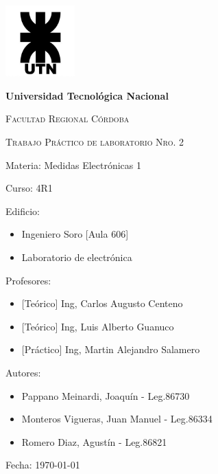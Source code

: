 \documentclass[12pt, letterpaper]{article}
\begin{document}
\begin{titlepage}
	\centering %
	{\includegraphics[width=0.2\textwidth]{imagenes/UTN_logo.jpg}\par}
	{\bfseries\LARGE Universidad Tecnológica Nacional \par}
	{\scshape\Large Facultad Regional Córdoba\par}
	\vspace{0.5cm}
	{\scshape\Huge Trabajo Práctico de laboratorio Nro. 2  \par}%
	\raggedright %
	\vspace{0.5cm}
	{\Large Materia: Medidas Electrónicas 1 \par}%
	\vspace{0.5cm}
	{\Large Curso: 4R1 \par}
	\vspace{0.5cm}
	{\Large Edificio: \par}%
	\begin{itemize}
		\item{\Large Ingeniero Soro [Aula 606] \par}
		\item{\Large Laboratorio de electrónica \par}
	\end{itemize}
	\vspace{0.5cm}
	{\Large Profesores: \par} %
	\begin{itemize}
		\item{\Large [Teórico] Ing, Carlos Augusto Centeno \par}
		\item{\Large [Teórico] Ing, Luis Alberto Guanuco \par}
		\item{\Large [Práctico] Ing, Martin Alejandro Salamero \par}
	\end{itemize}
	\vspace{0.5cm}
	{\Large Autores: \par} %
	\begin{itemize}
		\item{\Large Pappano Meinardi, Joaquín - Leg.86730\par}
		\item{\Large Monteros Vigueras, Juan Manuel - Leg.86334\par}
		\item{\Large Romero Diaz, Agustín - Leg.86821\par}
	\end{itemize}
	\vspace{0.5cm}
	{\Large Fecha: {\today} \par}%
\end{titlepage}
\end{document}

